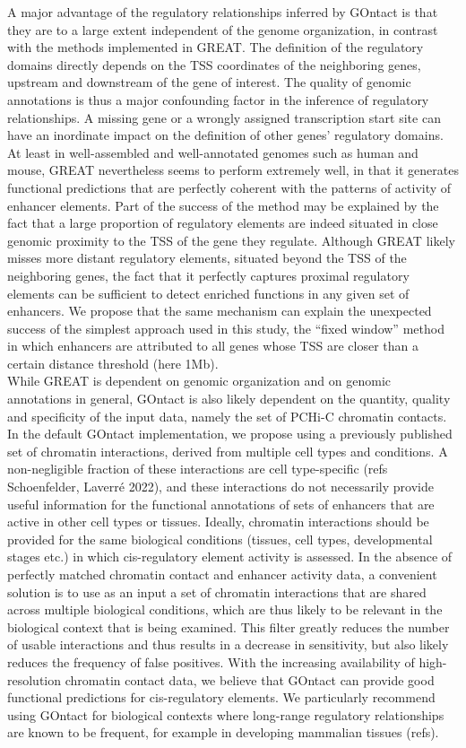 A major advantage of the regulatory relationships inferred by GOntact is that they are to a large extent independent of the genome organization, in contrast with the methods implemented in GREAT. The definition of the regulatory domains directly depends on the TSS coordinates of the neighboring genes, upstream and downstream of the gene of interest. The quality of genomic annotations is thus a major confounding factor in the inference of regulatory relationships. A missing gene or a wrongly assigned transcription start site can have an inordinate impact on the definition of other genes’ regulatory domains. At least in well-assembled and well-annotated genomes such as human and mouse, GREAT nevertheless seems to perform extremely well, in that it generates functional predictions that are perfectly coherent with the patterns of activity of enhancer elements. Part of the success of the method may be explained by the fact that a large proportion of regulatory elements are indeed situated in close genomic proximity to the TSS of the gene they regulate. Although GREAT likely misses more distant regulatory elements, situated beyond the TSS of the neighboring genes, the fact that it perfectly captures proximal regulatory elements can be sufficient to detect enriched functions in any given set of enhancers. We propose that the same mechanism can explain the unexpected success of the simplest approach used in this study, the “fixed window” method in which enhancers are attributed to all genes whose TSS are closer than a certain distance threshold (here 1Mb). \\

While GREAT is dependent on genomic organization and on genomic annotations in general, GOntact is also likely dependent on the quantity, quality and specificity of the input data, namely the set of PCHi-C chromatin contacts. In the default GOntact implementation, we propose using a previously published set of chromatin interactions, derived from multiple cell types and conditions. A non-negligible fraction of these interactions are cell type-specific (refs Schoenfelder, Laverré 2022), and these interactions do not necessarily provide useful information for the functional annotations of sets of enhancers that are active in other cell types or tissues. Ideally, chromatin interactions should be provided for the same biological conditions (tissues, cell types, developmental stages etc.) in which \acrshort{cis}-regulatory element activity is assessed. In the absence of perfectly matched chromatin contact and enhancer activity data, a convenient solution is to use as an input a set of chromatin interactions that are shared across multiple biological conditions, which are thus likely to be relevant in the biological context that is being examined. This filter greatly reduces the number of usable interactions and thus results in a decrease in sensitivity, but also likely reduces the frequency of false positives.  With the increasing availability of high-resolution chromatin contact data, we believe that GOntact can provide good functional predictions for \acrshort{cis}-regulatory elements. We particularly recommend using GOntact for biological contexts where long-range regulatory relationships are known to be frequent, for example in developing mammalian tissues (refs). 


